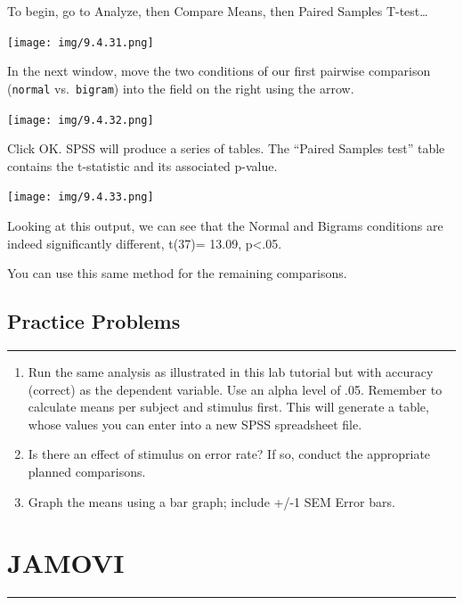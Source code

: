 \documentclass[
]{book}
\begin{document}
To begin, go to {Analyze}, then {Compare Means}, then {Paired Samples T-test\ldots{}}

\texttt{[image: img/9.4.31.png]}

In the next window, move the two conditions of our first pairwise comparison (\texttt{normal} vs.~\texttt{bigram}) into the field on the right using the arrow.

\texttt{[image: img/9.4.32.png]}

Click {OK}. SPSS will produce a series of tables. The ``Paired Samples test'' table contains the t-statistic and its associated p-value.

\texttt{[image: img/9.4.33.png]}

Looking at this output, we can see that the Normal and Bigrams conditions are indeed significantly different, t(37)= 13.09, p\textless.05.

You can use this same method for the remaining comparisons.

\hypertarget{practice-problems-5}{%
\subsection{Practice Problems}\label{practice-problems-5}}

\begin{center}\rule{0.5\linewidth}{0.5pt}\end{center}

\begin{enumerate}
\def\labelenumi{\arabic{enumi}.}
\item
  Run the same analysis as illustrated in this lab tutorial but with accuracy (correct) as the dependent variable. Use an alpha level of .05. Remember to calculate means per subject and stimulus first. This will generate a table, whose values you can enter into a new SPSS spreadsheet file.
\item
  Is there an effect of stimulus on error rate? If so, conduct the appropriate planned comparisons.
\item
  Graph the means using a bar graph; include +/-1 SEM Error bars.
\end{enumerate}

\hypertarget{jamovi-1}{%
\section{JAMOVI}\label{jamovi-1}}

\begin{center}\rule{0.5\linewidth}{0.5pt}\end{center}
\end{document}

